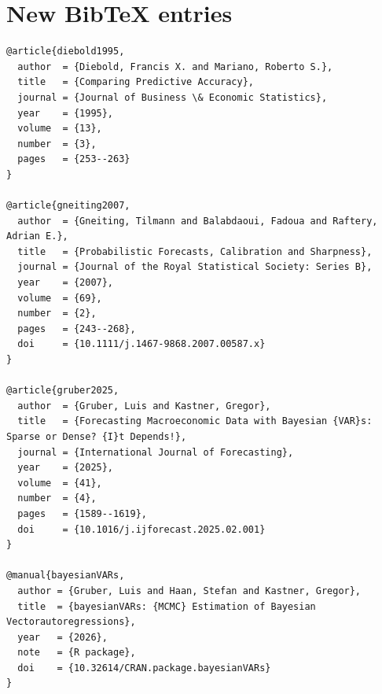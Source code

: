 \documentclass[11pt]{article}
\begin{document}
\section*{New BibTeX entries}

\begin{verbatim}
@article{diebold1995,
  author  = {Diebold, Francis X. and Mariano, Roberto S.},
  title   = {Comparing Predictive Accuracy},
  journal = {Journal of Business \& Economic Statistics},
  year    = {1995},
  volume  = {13},
  number  = {3},
  pages   = {253--263}
}

@article{gneiting2007,
  author  = {Gneiting, Tilmann and Balabdaoui, Fadoua and Raftery, Adrian E.},
  title   = {Probabilistic Forecasts, Calibration and Sharpness},
  journal = {Journal of the Royal Statistical Society: Series B},
  year    = {2007},
  volume  = {69},
  number  = {2},
  pages   = {243--268},
  doi     = {10.1111/j.1467-9868.2007.00587.x}
}

@article{gruber2025,
  author  = {Gruber, Luis and Kastner, Gregor},
  title   = {Forecasting Macroeconomic Data with Bayesian {VAR}s: Sparse or Dense? {I}t Depends!},
  journal = {International Journal of Forecasting},
  year    = {2025},
  volume  = {41},
  number  = {4},
  pages   = {1589--1619},
  doi     = {10.1016/j.ijforecast.2025.02.001}
}

@manual{bayesianVARs,
  author = {Gruber, Luis and Haan, Stefan and Kastner, Gregor},
  title  = {bayesianVARs: {MCMC} Estimation of Bayesian Vectorautoregressions},
  year   = {2026},
  note   = {R package},
  doi    = {10.32614/CRAN.package.bayesianVARs}
}
\end{verbatim}

\end{document}
